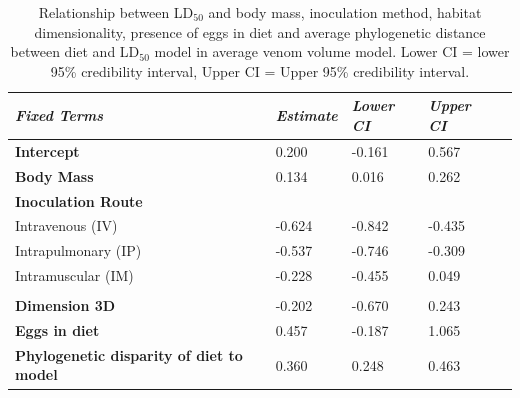 \begin{table}[H]
  \centering
    \caption[ ]{Relationship between LD$_{50}$ and body mass, inoculation method, habitat dimensionality, presence of eggs in diet and average phylogenetic distance between diet and LD$_{50}$ model in average venom volume model. Lower CI = lower 95\% credibility interval, Upper CI = Upper 95\% credibility interval.}
\begin{tabular}{*5l}    \toprule
\emph{Fixed Terms} & \emph{Estimate} & \emph{Lower CI} & \emph{Upper CI}\\\midrule
\textbf{Intercept} & 0.200  &  -0.161 & 0.567 \\ 
\textbf{Body Mass} & 0.134  & 0.016 & 0.262 \\ 
\textbf{Inoculation Route} &  &  &  \\ 
 Intravenous (IV) &  -0.624 &  -0.842 &  -0.435 \\
 Intrapulmonary (IP) &  -0.537 &  -0.746 &  -0.309 \\ 
 Intramuscular (IM) &  -0.228 &  -0.455 & 0.049 \\
  &  &  &  \\ 
\textbf{Dimension 3D} &  -0.202 &  -0.670 & 0.243 \\ 
\textbf{Eggs in diet} & 0.457 &  -0.187 & 1.065 \\ 
\textbf{Phylogenetic disparity of diet to model} & 0.360 & 0.248 & 0.463 \\\bottomrule
 \hline
\end{tabular}
  \label{tbl:Table 4.3.}
\end{table}






